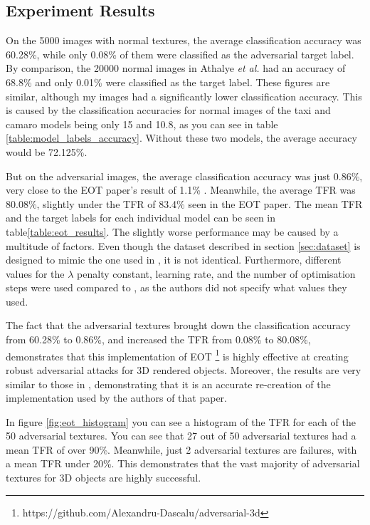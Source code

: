 \subsection{Experiment Results}
    \label{subsec:eot_experiment_results}

On the 5000 images with normal textures, the average classification accuracy was 60.28\%, while only 0.08\% of them were classified as the adversarial target label. By comparison, the 20000 normal images in Athalye \textit{et al.} \cite{athalye} had an accuracy of 68.8\% and only 0.01\% were classified as the target label. These figures are similar, although my images had a significantly lower classification accuracy. This is caused by the classification accuracies for normal images of the taxi and camaro models being only 15 and 10.8, as you can see in table \ref{table:model_labels_accuracy}. Without these two models, the average accuracy would be 72.125\%. 

But on the adversarial images, the average classification accuracy was just 0.86\%, very close to the EOT paper's result of 1.1\% \cite{athalye}. Meanwhile, the average TFR was 80.08\%, slightly under the TFR of 83.4\% seen in the EOT paper.  The mean TFR and the target labels for each individual model can be seen in table\ref{table:eot_results}. The slightly worse performance may be caused by a multitude of factors. Even though the dataset described in section \ref{sec:dataset} is designed to mimic the one used in \cite{athalye}, it is not identical. Furthermore, different values for the $\lambda$ penalty constant, learning rate, and the number of optimisation steps were used compared to \cite{athalye}, as the authors did not specify what values they used. 

The fact that the adversarial textures brought down the classification accuracy from 60.28\% to 0.86\%, and increased the TFR from 0.08\% to 80.08\%, demonstrates that this implementation of EOT \footnote{https://github.com/Alexandru-Dascalu/adversarial-3d} is highly effective at creating robust adversarial attacks for 3D rendered objects. Moreover, the results are very similar to those in \cite{athalye}, demonstrating that it is an accurate re-creation of the implementation used by the authors of that paper.

In figure \ref{fig:eot_histogram} you can see a histogram of the TFR for each of the 50 adversarial textures. You can see that 27 out of 50 adversarial textures had a mean TFR of over 90\%. Meanwhile, just 2 adversarial textures are failures, with a mean TFR under 20\%. This demonstrates that the vast majority of adversarial textures for 3D objects are highly successful.

